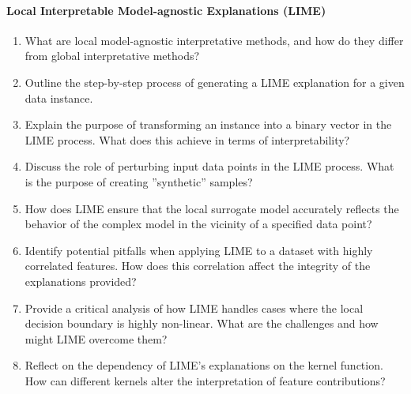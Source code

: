 \paragraph*{Local Interpretable Model-agnostic Explanations (LIME)}
\begin{enumerate}
    \item What are local model-agnostic interpretative methods, and how do they differ from global interpretative methods?
    \item Outline the step-by-step process of generating a LIME explanation for a given data instance.
    \item Explain the purpose of transforming an instance into a binary vector in the LIME process. What does this achieve in terms of interpretability?
    \item Discuss the role of perturbing input data points in the LIME process. What is the purpose of creating ''synthetic'' samples?
    \item How does LIME ensure that the local surrogate model accurately reflects the behavior of the complex model in the vicinity of a specified data point?
    \item Identify potential pitfalls when applying LIME to a dataset with highly correlated features. How does this correlation affect the integrity of the explanations provided?
    \item Provide a critical analysis of how LIME handles cases where the local decision boundary is highly non-linear. What are the challenges and how might LIME overcome them?
    \item Reflect on the dependency of LIME's explanations on the kernel function. How can different kernels alter the interpretation of feature contributions?
\end{enumerate}
